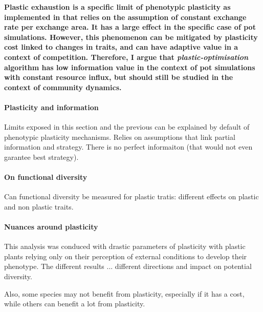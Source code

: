 \textbf{Plastic exhaustion is a specific limit of phenotypic plasticity as implemented in \model that relies on the assumption of constant exchange rate per exchange area. It has a large effect in the specific case of pot simulations. However, this phenomenon can be mitigated by plasticity cost linked to changes in traits, and can have adaptive value in a context of competition. Therefore, I argue that \textit{plastic-optimisation} algorithm  has low information value in the context of pot simulations with constant resource influx, but should still be studied in the context of community dynamics.}

\paragraph{Plasticity and information}

Limits exposed in this section and the previous can be explained by default of phenotypic plasticity mechanisms. Relies on assumptions that link partial information and strategy. There is no perfect informaiton (that would not even garantee best strategy). 


\paragraph{On functional diversity}

Can functional diversity be measured for plastic tratis: different effects on plastic and non plastic traits. 


\paragraph{Nuances around plasticity}
This analysis was conduced with drastic parameters of plasticity with plastic plants relying only on their perception of external conditions to develop their phenotype. The different results ... different directions and impact on potential diversity.

Also, some species may not benefit from plasticity, especially if it has a cost, while others can benefit a lot from plasticity.

